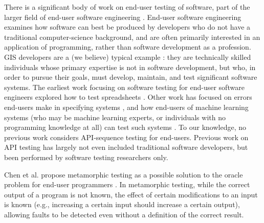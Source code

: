 There is a significant body of work on end-user testing of software,
part of the larger field of end-user software engineering
\cite{burnettEUSE,Silos}.  End-user software engineering examines how
software can best be produced by developers who do not have a
traditional computer-science background, and are often primarily
interested in an application of programming, rather than software
development as a profession.  GIS developers are a (we believe)
typical example \cite{Segal07}:  they are technically skilled  individuals whose
primary expertise is not in software development, but who, in order to
pursue their goals, must develop, maintain, and test significant
software systems.  The earliest work focusing on software testing for
end-user software engineers explored how to test spreadsheets
\cite{rothermelTOSEM,rothermel2000wysiwyt}.  Other work has focused on
errors end-users make in specifying systems \cite{Phalgune}, and how
end-users of machine learning systems (who may be machine learning
experts, or individuals with no programming knowledge at all) can test
such systems \cite{OnlyOracle,kulesza-eud11,shinsel-vlhcc}.  To our
knowledge, no previous work considers API-sequence testing for
end-users.  Previous work on API testing has largely not even included
traditional software developers, but been performed by software
testing researchers only.



Chen et al. propose metamorphic testing \cite{MetaTest,isstamorph,metamorph,chentest} as a possible
solution to the oracle problem for end-user programmers
\cite{MetamorphEndUser}.  In metamorphic testing, while the correct
output of a program is not known, the effect of certain
modifications to an input is known (e.g., increasing a certain input
should increase a certain output), allowing faults to be detected
even without a definition of the correct result.